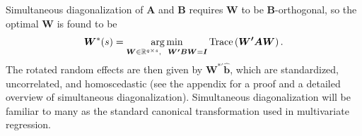 \documentclass[12pt]{article} %
\newcommand{\hh}[1]{{\color{orange} #1}}
\newcommand{\trans}{\ensuremath{^\prime}}
\DeclareMathOperator{\tr}{Trace}
\DeclareMathOperator*{\argmin}{arg\, min}
\begin{document}
{Simultaneous diagonalization of $\bm{A}$ and $\bm{B}$ requires $\bm{W}$ to be $\bm{B}$-orthogonal, so the optimal $\bm{W}$ is found to be
%
\begin{equation}\label{eq:optimw}
	\bm{W}^*(s) = \argmin_{ 
      \bm{W} \in \mathbb{R}^{q \times s}, \ \ 
      \bm{W\trans B W} = \bm{I}
	} 
\tr\left( \bm{W\trans A W} \right).
\end{equation}
%
The rotated random effects are then given by $\bm{W}^{*\prime} \widehat{\bm{b}}$, which are standardized, uncorrelated, and homoscedastic (see the appendix for a proof \hh{and a detailed overview of simultaneous diagonalization}). %
Simultaneous diagonalization will be familiar to many as the standard canonical transformation used in multivariate regression. %


}
\end{document}
